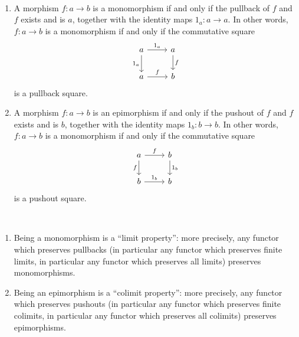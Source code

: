 \begin{lemma}\label{prop:mono_pullback}\phantom{}\\
\begin{enumerate}
\renewcommand{\labelenumi}{(\theenumi)}
\item A morphism $f : a \rightarrow b$ is a monomorphism if and only if
the pullback of $f$ and $f$ exists and is $a$, together with the identity maps $1_{a} : a \rightarrow a$.
In other words, $f : a \rightarrow b$ is a monomorphism if and only if the commutative square
\[
\begin{tikzcd}
a \arrow[r, "1_{a}"] \arrow[d, "1_{a}"'] & a \arrow[d, "f"] \\
a \arrow[r, "f"]                         & b               
\end{tikzcd}
\]
is a pullback square.
\item A morphism $f : a \rightarrow b$ is an epimorphism if and only if
the pushout of $f$ and $f$ exists and is $b$, together with the identity maps $1_{b} : b \rightarrow b$.
In other words, $f : a \rightarrow b$ is a monomorphism if and only if the commutative square
\[
\begin{tikzcd}
a \arrow[r, "f"] \arrow[d, "f"'] & b \arrow[d, "1_{b}"] \\
b \arrow[r, "1_{b}"]                         & b               
\end{tikzcd}
\]
is a pushout square.
\end{enumerate}
\end{lemma}

\begin{corollary}\label{cor:preserve_mono_epi}\phantom{}\\
\begin{enumerate}
\renewcommand{\labelenumi}{(\theenumi)}
\item Being a monomorphism is a “limit property”: more precisely, any functor which preserves pullbacks
(in particular any functor which preserves finite limits, in particular any functor which preserves all limits)
preserves monomorphisms.
\item Being an epimorphism is a “colimit property”: more precisely, any functor which preserves pushouts
(in particular any functor which preserves finite colimits, in particular any functor which preserves all colimits)
preserves epimorphisms.
\end{enumerate}
\end{corollary}


